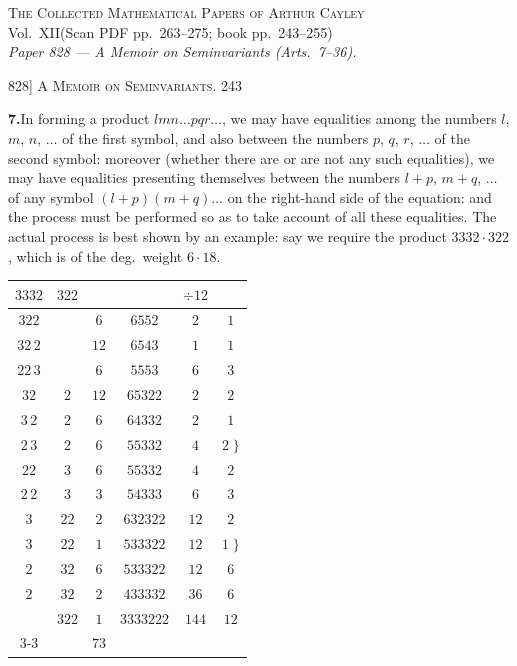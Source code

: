 \documentclass[11pt]{article}
\begin{document}
\begin{center}
{\large\scshape The Collected Mathematical Papers of Arthur Cayley}\\[0.3em]
{\large Vol.\ XII\quad (Scan PDF pp.\ 263--275; book pp.\ 243--255)}\\[0.4em]
{\itshape Paper 828 --- A Memoir on Seminvariants (Arts.\ 7--36).}
\end{center}
\vspace{0.6em}


\noindent\textsc{828] \hfill A Memoir on Seminvariants. \hfill 243}
\vspace{0.6em}

\medskip
\noindent\textbf{7.}\quad In forming a product $lmn\ldots pqr\ldots$, we may have equalities
among the numbers $l$, $m$, $n$, $\ldots$ of the first symbol, and also between the
numbers $p$, $q$, $r$, $\ldots$ of the second symbol: moreover (whether there are or
are not any such equalities), we may have equalities presenting themselves between
the numbers $l+p$, $m+q$, $\ldots$ of any symbol $(l+p)(m+q)\ldots$ on the right-hand
side of the equation: and the process must be performed so as to take account of
all these equalities. The actual process is best shown by an example: say we
require the product $3332\cdot 322$, which is of the deg.\ weight $6\cdot 18$.

\medskip
\begin{center}
\begin{tabular}{cc|cccc}
$3332$ & $322$ & & & $\div 12$ & \\ \hline
$322$ & & $6$ & $6552$ & $2$ & $1$\\
$32\,2$ & & $12$ & $6543$ & $1$ & $1$\\
$22\,3$ & & $6$ & $5553$ & $6$ & $3$\\
$32$ & $2$ & $12$ & $65322$ & $2$ & $2$\\
$3\,2$ & $2$ & $6$ & $64332$ & $2$ & $1$\\
$2\,3$ & $2$ & $6$ & $55332$ & $4$ & $2\;\Bigr\}$\\
$22$ & $3$ & $6$ & $55332$ & $4$ & $2$\\
$2\,2$ & $3$ & $3$ & $54333$ & $6$ & $3$\\
$3$ & $22$ & $2$ & $632322$ & $12$ & $2$\\
$3$ & $22$ & $1$ & $533322$ & $12$ & $1\;\Bigr\}$\\
$2$ & $32$ & $6$ & $533322$ & $12$ & $6$\\
$2$ & $32$ & $2$ & $433332$ & $36$ & $6$\\
 & $322$ & $1$ & $3333222$ & $144$ & $12$\\ \cline{3-3}
 & & $73$ & & & \\
\end{tabular}
\end{center}
\end{document}
